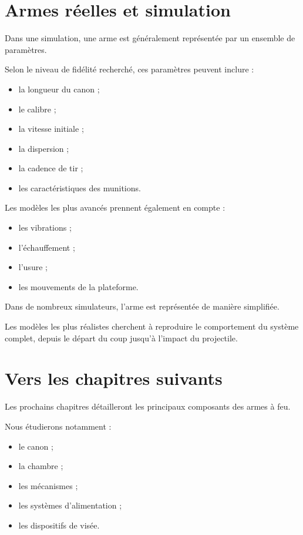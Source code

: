 \section{Armes réelles et simulation}

Dans une simulation, une arme est généralement représentée par un ensemble
de paramètres.

Selon le niveau de fidélité recherché, ces paramètres peuvent inclure :

\begin{itemize}
    \item la longueur du canon ;
    \item le calibre ;
    \item la vitesse initiale ;
    \item la dispersion ;
    \item la cadence de tir ;
    \item les caractéristiques des munitions.
\end{itemize}

Les modèles les plus avancés prennent également en compte :

\begin{itemize}
    \item les vibrations ;
    \item l'échauffement ;
    \item l'usure ;
    \item les mouvements de la plateforme.
\end{itemize}

\begin{simulation}

Dans de nombreux simulateurs, l'arme est représentée de manière simplifiée.

Les modèles les plus réalistes cherchent à reproduire le comportement du
système complet, depuis le départ du coup jusqu'à l'impact du projectile.

\end{simulation}

\section{Vers les chapitres suivants}

Les prochains chapitres détailleront les principaux composants des armes à
feu.

Nous étudierons notamment :

\begin{itemize}
    \item le canon ;
    \item la chambre ;
    \item les mécanismes ;
    \item les systèmes d'alimentation ;
    \item les dispositifs de visée.
\end{itemize}

